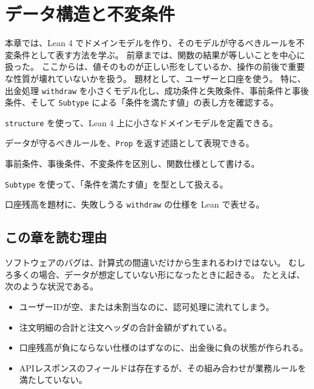 \chapter{データ構造と不変条件}
\label{chap:ch04_invariants}

\begin{chapterabstract}
本章では、Lean 4 でドメインモデルを作り、そのモデルが守るべきルールを不変条件として表す方法を学ぶ。
前章までは、関数の結果が等しいことを中心に扱った。
ここからは、値そのものが正しい形をしているか、操作の前後で重要な性質が壊れていないかを扱う。
題材として、ユーザーと口座を使う。
特に、出金処理 \texttt{withdraw} を小さくモデル化し、成功条件と失敗条件、事前条件と事後条件、そして \texttt{Subtype} による「条件を満たす値」の表し方を確認する。
\end{chapterabstract}

\begin{learninggoals}
\item \texttt{structure} を使って、Lean 4 上に小さなドメインモデルを定義できる。
\item データが守るべきルールを、\texttt{Prop} を返す述語として表現できる。
\item 事前条件、事後条件、不変条件を区別し、関数仕様として書ける。
\item \texttt{Subtype} を使って、「条件を満たす値」を型として扱える。
\item 口座残高を題材に、失敗しうる \texttt{withdraw} の仕様を Lean で表せる。
\end{learninggoals}

\section{この章を読む理由}

ソフトウェアのバグは、計算式の間違いだけから生まれるわけではない。
むしろ多くの場合、データが想定していない形になったときに起きる。
たとえば、次のような状況である。

\begin{itemize}
\item ユーザーIDが空、または未割当なのに、認可処理に流れてしまう。
\item 注文明細の合計と注文ヘッダの合計金額がずれている。
\item 口座残高が負にならない仕様のはずなのに、出金後に負の状態が作られる。
\item APIレスポンスのフィールドは存在するが、その組み合わせが業務ルールを満たしていない。
\end{itemize}

